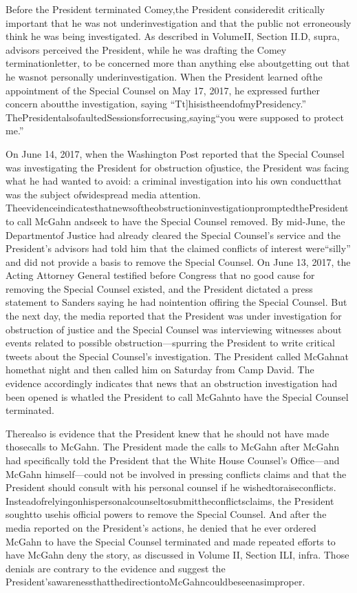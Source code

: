 {Before the President terminated Comey,the President consideredit critically important that he was not underinvestigation and that the public not erroneously think he was being investigated.
As described in VolumeII, Section II.D, supra, advisors perceived the President, while he was drafting the Comey terminationletter, to be concerned more than anything else aboutgetting out that he wasnot personally underinvestigation.
When the President learned ofthe appointment of the Special Counsel on May 17, 2017, he expressed further concern aboutthe investigation, saying “Tt]hisistheendofmyPresidency.”
ThePresidentalsofaultedSessionsforrecusing,saying“you were supposed to protect me.”

On June 14, 2017, when the Washington Post reported that the Special Counsel was investigating the President for obstruction ofjustice, the President was facing what he had wanted to avoid: a criminal investigation into his own conductthat was the subject ofwidespread media attention.
TheevidenceindicatesthatnewsoftheobstructioninvestigationpromptedthePresident to call McGahn andseek to have the Special Counsel removed.
By mid-June, the Departmentof Justice had already cleared the Special Counsel’s service and the President’s advisors had told him that the claimed conflicts of interest were“silly” and did not provide a basis to remove the Special Counsel.
On June 13, 2017, the Acting Attorney General testified before Congress that no good cause for removing the Special Counsel existed, and the President dictated a press statement to Sanders saying he had nointention offiring the Special Counsel.
But the next day, the media reported that the President was under investigation for obstruction of justice and the Special Counsel was interviewing witnesses about events related to possible obstruction—spurring the President to write critical tweets about the Special Counsel’s investigation.
The President called McGahnat homethat night and then called him on Saturday from Camp David.
The evidence accordingly indicates that news that an obstruction investigation had been opened is whatled the President to call McGahnto have the Special Counsel terminated.

Therealso is evidence that the President knew that he should not have made thosecalls to McGahn.
The President made the calls to McGahn after McGahn had specifically told the President that the White House Counsel’s Office—and McGahn himself—could not be involved in pressing conflicts claims and that the President should consult with his personal counsel if he wishedtoraiseconflicts.
Insteadofrelyingonhispersonalcounseltosubmittheconflictsclaims, the President soughtto usehis official powers to remove the Special Counsel.
And after the media reported on the President’s actions, he denied that he ever ordered McGahn to have the Special Counsel terminated and made repeated efforts to have McGahn deny the story, as discussed in Volume II, Section ILI, infra. Those denials are contrary to the evidence and suggest the President’sawarenessthatthedirectiontoMcGahncouldbeseenasimproper.

}
